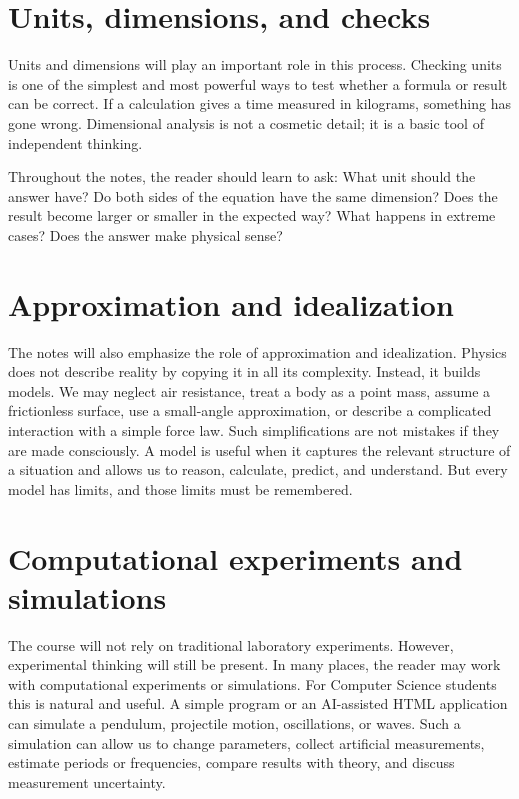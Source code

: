\section{Units, dimensions, and checks}

Units and dimensions will play an important role in this process. Checking units is one of the simplest and most powerful ways to test whether a formula or result can be correct. If a calculation gives a time measured in kilograms, something has gone wrong. Dimensional analysis is not a cosmetic detail; it is a basic tool of independent thinking.

Throughout the notes, the reader should learn to ask: What unit should the answer have? Do both sides of the equation have the same dimension? Does the result become larger or smaller in the expected way? What happens in extreme cases? Does the answer make physical sense?

\section{Approximation and idealization}

The notes will also emphasize the role of approximation and idealization. Physics does not describe reality by copying it in all its complexity. Instead, it builds models. We may neglect air resistance, treat a body as a point mass, assume a frictionless surface, use a small-angle approximation, or describe a complicated interaction with a simple force law. Such simplifications are not mistakes if they are made consciously. A model is useful when it captures the relevant structure of a situation and allows us to reason, calculate, predict, and understand. But every model has limits, and those limits must be remembered.

\section{Computational experiments and simulations}

The course will not rely on traditional laboratory experiments. However, experimental thinking will still be present. In many places, the reader may work with computational experiments or simulations. For Computer Science students this is natural and useful. A simple program or an AI-assisted HTML application can simulate a pendulum, projectile motion, oscillations, or waves. Such a simulation can allow us to change parameters, collect artificial measurements, estimate periods or frequencies, compare results with theory, and discuss measurement uncertainty.

